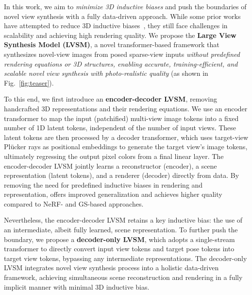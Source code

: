 In this work, we aim to \emph{minimize 3D inductive biases} and push the boundaries of novel view synthesis with a fully data-driven approach. While some prior works have attempted to reduce 3D inductive biases~\citep{sitzmann2021lightfieldnetwork,sajjadi2022srt, kulhanek2022viewformer}, they still face challenges in scalability and achieving high rendering quality. We propose the \textbf{Large View Synthesis Model (LVSM)}, a novel transformer-based framework that synthesizes novel-view images from posed sparse-view inputs \emph{without predefined rendering equations or 3D structures, enabling accurate, training-efficient, and scalable novel view synthesis with photo-realistic quality} (as shown in Fig.~\ref{fig:teaser}).

To this end, we first introduce an \textbf{encoder-decoder LVSM}, removing handcrafted 3D representations and their rendering equations.
We use an encoder transformer to map the input (patchified) multi-view image tokens into a fixed number of 1D latent tokens, independent of the number of input views. These latent tokens are then processed by a decoder transformer, which uses target-view Plücker rays as positional embeddings to generate the target view’s image tokens, ultimately regressing the output pixel colors from a final linear layer. The encoder-decoder LVSM jointly learns a reconstructor (encoder), a scene representation (latent tokens), and a renderer (decoder) directly from data. By removing the need for predefined inductive biases in rendering and representation, \paperName offers improved generalization and achieves higher quality compared to NeRF- and GS-based approaches. 

Nevertheless, the encoder-decoder LVSM retains a key inductive bias: the use of an intermediate, albeit fully learned, scene representation. To further push the boundary, we propose a \textbf{decoder-only LVSM}, which adopts a single-stream transformer to directly convert input view tokens and target pose tokens into target view tokens, bypassing any intermediate representations. The decoder-only LVSM integrates novel view synthesis process into a holistic data-driven framework, achieving simultaneous scene reconstruction and rendering in a fully implicit manner with minimal 3D inductive bias.


